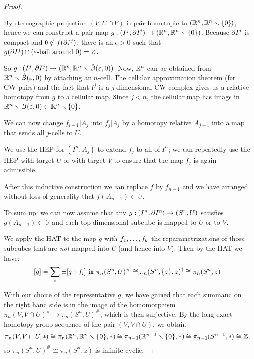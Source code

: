\begin{proof}
\begin{claimproof}
By stereographic projection $(V,U\cap V)$ is pair homotopic to $({\mathbb R}^n,{\mathbb R}^n\smallsetminus\{0\})$, hence we can construct a pair map $g:(I^j,\partial I^j)\to ({\mathbb R}^n,{\mathbb R}^n\smallsetminus\{0\})$. Because $\partial I^j$ is compact and $0\notin f(\partial I^j)$, there is an $\epsilon>0$ such that $g(\partial I^j)\cap(\varepsilon\text{-ball around }0)=\varnothing$.

So $g:(I^j,\partial I^j)\to({\mathbb R}^n,{\mathbb R}^n\smallsetminus\mathring B(\varepsilon,0))$. Now, ${\mathbb R}^n$ can be obtained from ${\mathbb R}^n\smallsetminus\mathring B(\varepsilon,0)$ by attaching an $n$-cell. The cellular approximation theorem (for CW-pairs) and the fact that $I^j$ is a $j$-dimensional CW-complex gives us a relative homotopy from $g$ to a cellular map. Since $j<n$, the cellular map has image in ${\mathbb R}^n\smallsetminus\mathring B(\varepsilon,0)\subset{\mathbb R}^n\smallsetminus\{0\}$.
\end{claimproof}

We can now change $f_{j-1}|A_j$ into $f_j|A_j$ by a homotopy relative $A_{j-1}$ into a map that sends all $j$-cells to $U$.

We use the HEP for $(I^n,A_j)$ to extend $f_j$ to all of $I^n$; we can repeatedly use the HEP with target $U$ or with target $V$ to ensure that the map $f_j$ is again admissible.

After this inductive construction we can replace $f$ by $f_{n-1}$ and we have arranged without loss of generality that $f(A_{n-1})\subset U$.

To sum up: we can now assume that any $g:(I^n,\partial I^n)\to(S^n,U)$ satisfies $g(A_{n-1})\subset U$ and each top-dimensional subcube is mapped to $U$ or to $V$.

We apply the HAT to the map $g$ with ${{f}_1,\dots,{f}_{k}}$ the reparametrizations of those subcubes that are \textit{not} mapped into $U$ (and hence into $V$). Then by the HAT we have:
\[[g]=\sum_i\pm[g\circ f_i]\text{ in }\pi_n(S^n,U)^\#\cong\pi_n(S^n,\{z\},z)^\dagger\cong\pi_n(S^n,z)\]

With our choice of the representative $g$, we have gained that each summand on the right hand side is in the image of the homomorphism $\pi_n(V,V\cap U)^\#\to\pi_n(S^n,U)^\#$, which is then surjective. By the long exact homotopy group sequence of the pair $(V,V\cap U)$, we obtain
\[\pi_n(V,V\cap U,*)\cong\pi_n({\mathbb R}^n,{\mathbb R}^n\smallsetminus\{0\},*)\cong\pi_{n-1}({\mathbb R}^{n-1}\smallsetminus\{0\},*)\cong\pi_{n-1}(S^{n-1},*)\cong{\mathbb Z},\]
so $\pi_n(S^n,U)^\#\cong\pi_n(S^n,z)$ is infinite cyclic.
\end{proof}

